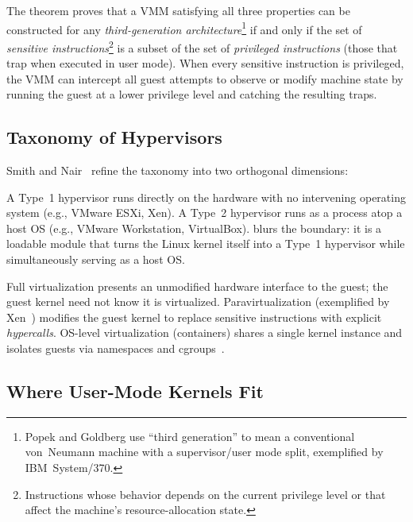 The theorem proves that a VMM satisfying all three properties can be
constructed for any \emph{third-generation architecture}\footnote{
  Popek and Goldberg use ``third generation'' to mean a conventional
  von~Neumann machine with a supervisor/user mode split, exemplified by
  IBM~System/370.}
if and only if the set of \emph{sensitive instructions}\footnote{
  Instructions whose behavior depends on the current privilege level or
  that affect the machine's resource-allocation state.}
is a subset of the set of \emph{privileged instructions} (those that
trap when executed in user mode).  When every sensitive instruction is
privileged, the VMM can intercept all guest attempts to observe or
modify machine state by running the guest at a lower privilege level
and catching the resulting traps.

\subsection{Taxonomy of Hypervisors}

Smith and Nair~\cite{smith2005book} refine the taxonomy into two
orthogonal dimensions:

\begin{description}[style=nextline]
  \item[Type~1 (bare-metal) vs.\ Type~2 (hosted) hypervisors.]
    A Type~1 hypervisor runs directly on the hardware with no
    intervening operating system (e.g., VMware ESXi, Xen).  A Type~2
    hypervisor runs as a process atop a host OS (e.g., VMware
    Workstation, VirtualBox).  \KVM{} blurs the boundary: it is a
    loadable module that turns the Linux kernel itself into a Type~1
    hypervisor while simultaneously serving as a host OS.

  \item[Full virtualization vs.\ paravirtualization vs.\ OS-level.]
    Full virtualization presents an unmodified hardware interface to
    the guest; the guest kernel need not know it is virtualized.
    Paravirtualization (exemplified by Xen~\cite{barham2003}) modifies
    the guest kernel to replace sensitive instructions with explicit
    \emph{hypercalls}.  OS-level virtualization (containers) shares a
    single kernel instance and isolates guests via namespaces and
    cgroups~\cite{soltesz2007}.
\end{description}

\subsection{Where User-Mode Kernels Fit}


